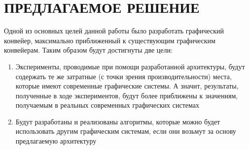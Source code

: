 \chapter{ПРЕДЛАГАЕМОЕ РЕШЕНИЕ} \label{ch3}
Одной из основных целей данной работы было разработать графический конвейер, максимально приближенный к существующим графическим конвейерам. Таким образом будут достигнуты две цели:
\begin{enumerate}[1.] 
	\item Эксперименты, проводимые при помощи разработанной архитектуры, будут содержать те же затратные (с точки зрения производительности) места, которые имеют современные графические системы. А значит, результаты, полученные в ходе экспериментов, будут более приближены к значениям, получаемым в реальных современных графических системах
	\item Будут разработаны и реализованы алгоритмы, которые можно будет использовать другим графическим системам, если они возьмут за основу предлагаемую архитектуру
\end{enumerate}







%
